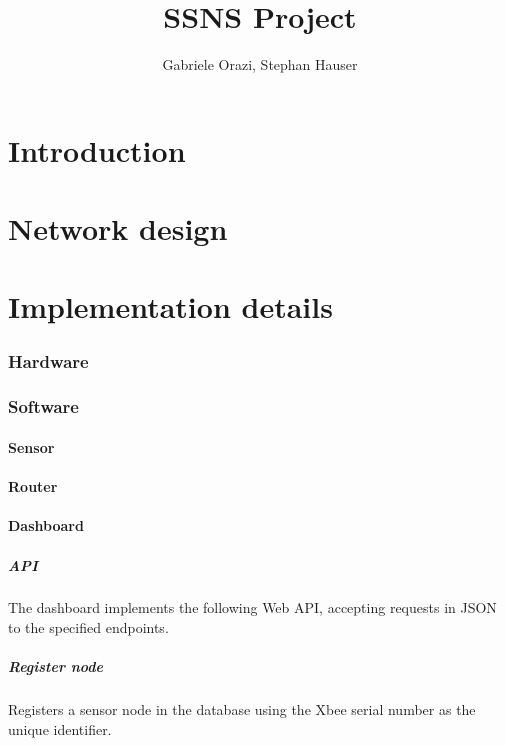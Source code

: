 \documentclass[a4paper,11pt]{scrartcl}
\title{SSNS Project}
\author{Gabriele Orazi, Stephan Hauser}
\begin{document}
\maketitle

\part{Introduction}

\part{Network design}

\part{Implementation details}
\section{Hardware}

\section{Software}
\subsection{Sensor}

\subsection{Router}

\subsection{Dashboard}
\subsubsection{API}
The dashboard implements the following Web API, accepting requests in JSON to the specified endpoints.

\subsubsection*{Register node}
Registers a sensor node in the database using the Xbee serial number as the unique identifier.
\end{document}
